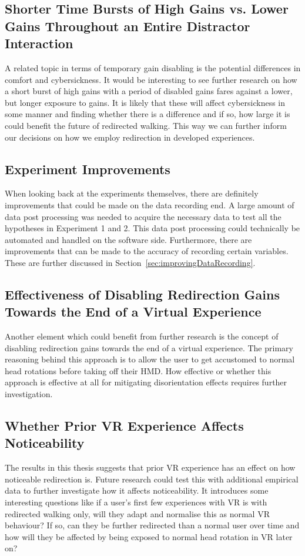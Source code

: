 \subsection{Shorter Time Bursts of High Gains vs. Lower Gains Throughout an Entire Distractor Interaction}
A related topic in terms of temporary gain disabling is the potential differences in comfort and cybersickness. It would be interesting to see further research on how a short burst of high gains with a period of disabled gains fares against a lower, but longer exposure to gains. It is likely that these will affect cybersickness in some manner and finding whether there is a difference and if so, how large it is could benefit the future of redirected walking. This way we can further inform our decisions on how we employ redirection in developed experiences.

\subsection{Experiment Improvements}
When looking back at the experiments themselves, there are definitely improvements that could be made on the data recording end. A large amount of data post processing was needed to acquire the necessary data to test all the hypotheses in Experiment 1 and 2. This data post processing could technically be automated and handled on the software side. Furthermore, there are improvements that can be made to the accuracy of recording certain variables. These are further discussed in Section~\ref{sec:improvingDataRecording}. 

\subsection{Effectiveness of Disabling Redirection Gains Towards the End of a Virtual Experience}
Another element which could benefit from further research is the concept of disabling redirection gains towards the end of a virtual experience. The primary reasoning behind this approach is to allow the user to get accustomed to normal head rotations before taking off their HMD. How effective or whether this approach is effective at all for mitigating disorientation effects requires further investigation.
  
\subsection{Whether Prior VR Experience Affects Noticeability}
The results in this thesis suggests that prior VR experience has an effect on how noticeable redirection is. Future research could test this with additional empirical data to further investigate how it affects noticeability. It introduces some interesting questions like if a user's first few experiences with VR is with redirected walking only, will they adapt and normalise this as normal VR behaviour? If so, can they be further redirected than a normal user over time and how will they be affected by being exposed to normal head rotation in VR later on?

